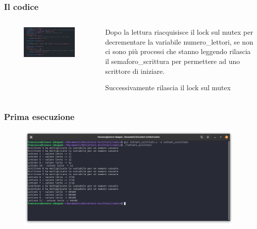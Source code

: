 \documentclass[10pt]{beamer}
\begin{document}
\begin{frame}[fragile]
	\frametitle{Il codice}
	\begin{columns}
		\begin{column}{0.3\textwidth}
			
			\begin{figure}
				\centering
				\includegraphics[width=2\linewidth]{img/lettore}
			\end{figure}
			
		\end{column}\hspace{100pt}
		\begin{column}{0.3\textwidth}
		Dopo la lettura riacquisisce il lock sul mutex per decrementare la variabile numero\_lettori, se non ci sono più processi che stanno leggendo rilascia il semaforo\_scrittura per permettere ad uno scrittore di iniziare.
		
		Successivamente rilascia il lock sul mutex
		\end{column}
	\end{columns}
	
\end{frame}
	\begin{frame}[fragile]
		\frametitle{Prima esecuzione}
		\begin{figure}
			\centering
			\includegraphics[width=1.03\linewidth]{img/esecuzione/programC1}
			\label{fig:programc1}
		\end{figure}
	\end{frame}
\end{document}
